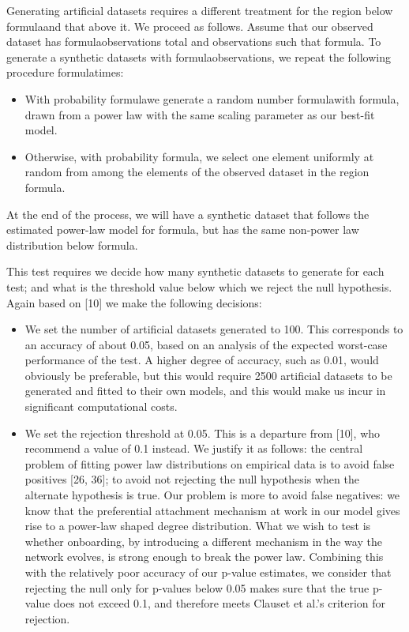 Generating artificial datasets requires a different treatment for the region below formulaand that above it. We proceed as follows. Assume that our observed dataset has formulaobservations total and observations such that formula. To generate a synthetic datasets with formulaobservations, we repeat the following procedure formulatimes:
\begin{itemize}
\item With probability formulawe generate a random number formulawith formula, drawn from a power law with the same scaling parameter as our best-fit model.
\item Otherwise, with probability formula, we select one element uniformly at random from among the elements of the observed dataset in the region formula.
\end{itemize}

At the end of the process, we will have a synthetic dataset that follows the estimated power-law model for formula, but has the same non-power law distribution below formula.

This test requires we decide how many synthetic datasets to generate for each test; and what is the threshold value below which we reject the null hypothesis. Again based on [10] we make the following decisions:

\begin{itemize}
\item We set the number of artificial datasets generated to 100. This corresponds to an accuracy of about 0.05, based on an analysis of the expected worst-case performance of the test. A  higher degree of accuracy, such as 0.01, would obviously be preferable, but this would require 2500 artificial datasets to be generated and fitted to their own models, and this would make us incur in significant computational costs.
\item We set the rejection threshold at 0.05. This is a departure from [10], who recommend a value of 0.1 instead. We justify it as follows: the central problem of fitting power law distributions on empirical data is to avoid false positives [26, 36]; to avoid not rejecting the null hypothesis when the alternate hypothesis is true. Our problem is more to avoid false negatives: we know that the preferential attachment mechanism at work in our model gives rise to a power-law shaped degree distribution. What we wish to test is whether onboarding, by introducing a different mechanism in the way the network evolves, is strong enough to break the power law. Combining this with the relatively poor accuracy of our p-value estimates, we consider that rejecting the null only for p-values below 0.05 makes sure that the true p-value does not exceed 0.1, and therefore meets Clauset et al.'s criterion for rejection.
\end{itemize}


